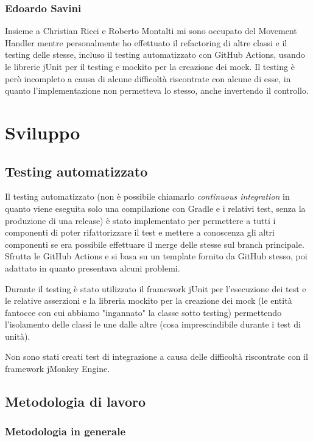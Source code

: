 \subsection{Edoardo Savini}
Insieme a Christian Ricci e Roberto Montalti mi sono occupato del Movement Handler mentre personalmente ho effettuato il refactoring di altre classi e il testing delle stesse, incluso il testing automatizzato con GitHub Actions, usando le librerie jUnit per il testing e mockito per la creazione dei mock. Il testing è però incompleto a causa di alcune difficoltà riscontrate con alcune di esse, in quanto l'implementazione non permetteva lo stesso, anche invertendo il controllo.

\chapter{Sviluppo}

\section{Testing automatizzato}

Il testing automatizzato (non è possibile chiamarlo \emph{continuous integration} in quanto viene eseguita solo una compilazione con Gradle e i relativi test, senza la produzione di una release) è stato implementato per permettere a tutti i componenti di poter rifattorizzare il test e mettere a conoscenza gli altri componenti se era possibile effettuare il merge delle stesse sul branch principale. Sfrutta le GitHub Actions e si basa su un template fornito da GitHub stesso, poi adattato in quanto presentava alcuni problemi.

Durante il testing è stato utilizzato il framework jUnit per l'esecuzione dei test e le relative asserzioni e la libreria mockito per la creazione dei mock (le entità fantocce con cui abbiamo "ingannato" la classe sotto testing) permettendo l'isolamento delle classi le une dalle altre (cosa imprescindibile durante i test di unità).

Non sono stati creati test di integrazione a causa delle difficoltà riscontrate con il framework jMonkey Engine.

\section{Metodologia di lavoro}

\subsection{Metodologia in generale}

